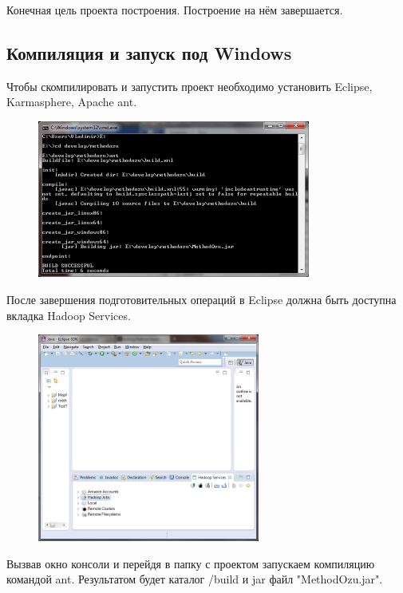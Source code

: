\documentclass[12pt,a4paper]{extarticle} %
\begin{document}
    Конечная цель проекта построения. Построение на нём завершается.


\newpage
\subsection{Компиляция и запуск под Windows}
    Чтобы скомпилировать и запустить проект необходимо установить Eclipse, Karmasphere, Apache ant.
\begin{figure}[h]
    \centering
    \includegraphics[width=0.8\textwidth]{images/windows-compile.png}
\end{figure}

    После завершения подготовительных операций в Eclipse должна быть доступна вкладка Hadoop Services.
\begin{figure}[h]
    \centering
    \includegraphics[width=0.65\textwidth]{images/eclipse-hadoop-services.png}
\end{figure}

\clearpage\newpage
    Вызвав окно консоли и перейдя в папку с проектом запускаем компиляцию командой ant. Результатом будет каталог /build и jar файл "MethodOzu.jar".
\end{document}
